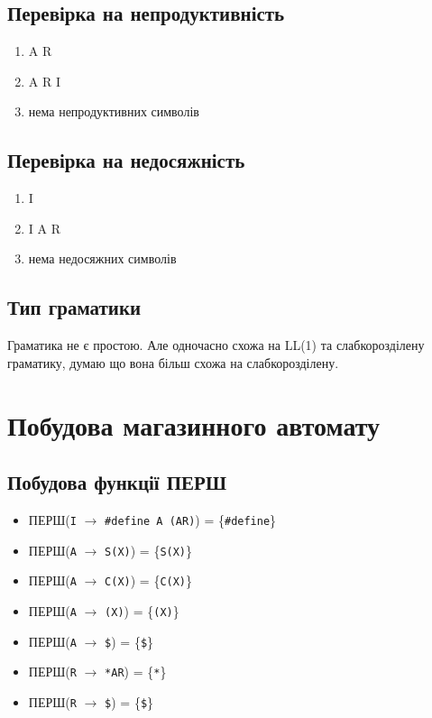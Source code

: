 \subsection{Перевірка на непродуктивність}
\begin{enumerate}
    \item  A R
    \item  A R I
    \item  нема непродуктивних символів
\end{enumerate}

\subsection{Перевірка на недосяжність}
\begin{enumerate}
    \item  I
    \item  I A R
    \item  нема недосяжних символів
\end{enumerate}

\subsection{Тип граматики}
Граматика не є простою. Але одночасно схожа на LL(1) та слабкорозділену граматику, думаю що вона більш схожа на слабкорозділену.

\newpage
\section{Побудова магазинного автомату}
\subsection{Побудова функції ПЕРШ}
\begin{itemize}
    \item  ПЕРШ(\verb|I| $\to$ \verb|#define A (AR)|) = \{\verb|#define|\}
    \item  ПЕРШ(\verb|A| $\to$ \verb|S(X)|) = \{\verb|S(X)|\}
    \item  ПЕРШ(\verb|A| $\to$ \verb|C(X)|) = \{\verb|C(X)|\}
    \item  ПЕРШ(\verb|A| $\to$ \verb|(X)|) = \{\verb|(X)|\}
    \item  ПЕРШ(\verb|A| $\to$ \verb|$|) = \{\verb|$|\}
    \item  ПЕРШ(\verb|R| $\to$ \verb|*AR|) = \{\verb|*|\}
    \item  ПЕРШ(\verb|R| $\to$ \verb|$|) = \{\verb|$|\}
\end{itemize}

